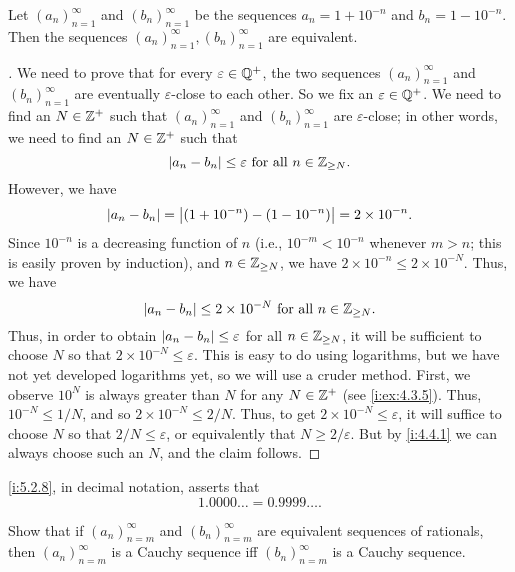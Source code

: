\begin{prop}\label{i:5.2.8}
  Let \((a_n)_{n = 1}^{\infty}\) and \((b_n)_{n = 1}^{\infty}\) be the sequences \(a_n = 1 + 10^{-n}\) and \(b_n = 1 - 10^{-n}\).
  Then the sequences \((a_n)_{n = 1}^{\infty}, (b_n)_{n = 1}^{\infty}\) are equivalent.
\end{prop}

\begin{proof}[]
  We need to prove that for every \(\varepsilon \in \mathbb{Q}^+\), the two sequences \((a_n)_{n = 1}^{\infty}\) and \((b_n)_{n = 1}^{\infty}\) are eventually \(\varepsilon\)-close to each other.
  So we fix an \(\varepsilon \in \mathbb{Q}^+\).
  We need to find an \(N \in \mathbb{Z}^+\) such that \((a_n)_{n = 1}^{\infty}\) and \((b_n)_{n = 1}^{\infty}\) are \(\varepsilon\)-close;
  in other words, we need to find an \(N \in \mathbb{Z}^+\) such that
  \[
    \left\lvert a_n - b_n\right\rvert \leq \varepsilon \text{ for all } n \in \mathbb{Z}_{\geq N}.
  \]
  However, we have
  \[
    \left\lvert a_n - b_n\right\rvert = \left\lvert(1 + 10^{-n}) - (1 - 10^{-n})\right\rvert = 2 \times 10^{-n}.
  \]
  Since \(10^{-n}\) is a decreasing function of \(n\) (i.e., \(10^{-m} < 10^{-n}\) whenever \(m > n\);
  this is easily proven by induction), and \(n \in \mathbb{Z}_{\geq N}\), we have \(2 \times 10^{-n} \leq 2 \times 10^{-N}\).
  Thus, we have
  \[
    \left\lvert a_n - b_n\right\rvert \leq 2 \times 10^{-N} \text{ for all } n \in \mathbb{Z}_{\geq N}.
  \]
  Thus, in order to obtain \(\left\lvert a_n - b_n\right\rvert \leq \varepsilon\) for all \(n \in \mathbb{Z}_{\geq N}\), it will be sufficient to choose \(N\) so that \(2 \times 10^{-N} \leq \varepsilon\).
  This is easy to do using logarithms, but we have not yet developed logarithms yet, so we will use a cruder method.
  First, we observe \(10^N\) is always greater than \(N\) for any \(N \in \mathbb{Z}^+\) (see \cref{i:ex:4.3.5}).
  Thus, \(10^{-N} \leq 1 / N\), and so \(2 \times 10^{-N} \leq 2 / N\).
  Thus, to get \(2 \times 10^{-N} \leq \varepsilon\), it will suffice to choose \(N\) so that \(2 / N \leq \varepsilon\), or equivalently that \(N \geq 2 / \varepsilon\).
  But by \cref{i:4.4.1} we can always choose such an \(N\), and the claim follows.
\end{proof}

\begin{rmk}\label{i:5.2.9}
  \cref{i:5.2.8}, in decimal notation, asserts that
  \[
    1.0000 \dots = 0.9999 \dots.
  \]
\end{rmk}

\exercisesection

\begin{ex}\label{i:ex:5.2.1}
  Show that if \((a_n)_{n = m}^{\infty}\) and \((b_n)_{n = m}^{\infty}\) are equivalent sequences of rationals, then \((a_n)_{n = m}^{\infty}\) is a Cauchy sequence iff \((b_n)_{n = m}^{\infty}\) is a Cauchy sequence.
\end{ex}

